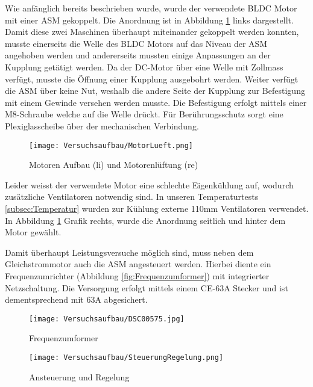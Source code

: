 Wie anfänglich bereits beschrieben wurde, wurde der verwendete BLDC Motor mit einer ASM gekoppelt. Die Anordnung ist in Abbildung \ref{fig:MotorenLueftung} links dargestellt. Damit diese zwei Maschinen überhaupt miteinander gekoppelt werden konnten, musste einerseits die Welle des BLDC Motors auf das Niveau der ASM angehoben werden und andererseits mussten einige Anpassungen an der Kupplung getätigt werden. Da der DC-Motor über eine Welle mit Zollmass verfügt, musste die Öffnung einer Kupplung ausgebohrt werden. Weiter verfügt die ASM über keine Nut, weshalb die andere Seite der Kupplung zur Befestigung mit einem Gewinde versehen werden musste. Die Befestigung erfolgt mittels einer M8-Schraube welche auf die Welle drückt. Für Berührungsschutz sorgt eine Plexiglasscheibe über der mechanischen Verbindung.


\begin{figure}[H]
	\begin{center}
		\texttt{[image: Versuchsaufbau/MotorLueft.png]}
		\caption[Motoren Aufbau und Motorenlüftung]{Motoren Aufbau (li) und Motorenlüftung (re)}
		\label{fig:MotorenLueftung}
	\end{center}
\end{figure}

Leider weisst der verwendete Motor eine schlechte Eigenkühlung auf, wodurch zusätzliche Ventilatoren notwendig sind. In unseren Temperaturtests \ref{subsec:Temperatur} wurden zur Kühlung externe 110mm Ventilatoren verwendet. In Abbildung \ref{fig:MotorenLueftung} Grafik rechts, wurde die Anordnung seitlich und hinter dem Motor gewählt.



Damit überhaupt Leistungsversuche möglich sind, muss neben dem Gleichstrommotor auch die ASM angesteuert werden. Hierbei diente ein Frequenzumrichter (Abbildung \ref{fig:Frequenzumformer}) mit integrierter Netzschaltung. Die Versorgung erfolgt mittels einem CE-63A Stecker und ist dementsprechend mit 63A abgesichert.

\begin{figure}[H]
	\centering
	\begin{minipage}[h]{.4\linewidth} %
		\centering
		\texttt{[image: Versuchsaufbau/DSC00575.jpg]}
		\caption[Frequenzumformer]{Frequenzumformer}
		\label{fig:Frequenzumformer}
	\end{minipage}
	\quad %
	\begin{minipage}[h]{.4\linewidth} %
		\centering
		\texttt{[image: Versuchsaufbau/SteuerungRegelung.png]}
		\caption[Ansteuerung und Regelung]{Ansteuerung und Regelung}
		\label{fig:AnsteuerungRegelung}
	\end{minipage}
\end{figure}

